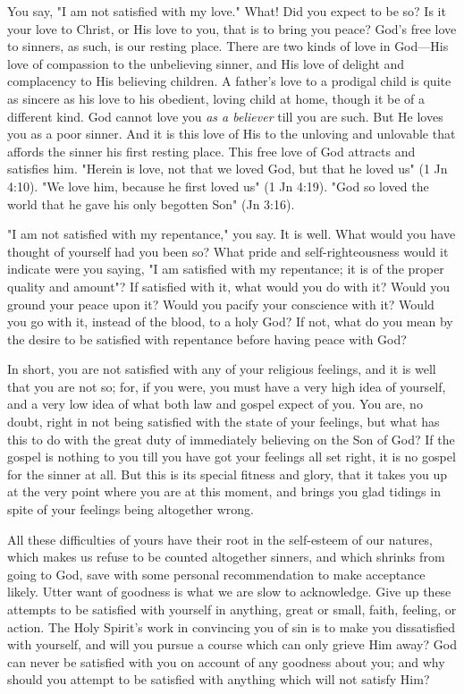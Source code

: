 \documentclass[
]{book}
\begin{document}
You say, "I am not satisfied with my love." What! Did you expect to be so? Is it your love to Christ, or His love to you, that is to bring you peace? God's free love to sinners, as such, is our resting place. There are two kinds of love in God---His love of compassion to the unbelieving sinner, and His love of delight and complacency to His believing children. A father's love to a prodigal child is quite as sincere as his love to his obedient, loving child at home, though it be of a different kind. God cannot love you \emph{as a believer} till you are such. But He loves you as a poor sinner. And it is this love of His to the unloving and unlovable that affords the sinner his first resting place. This free love of God attracts and satisfies him. "Herein is love, not that we loved God, but that he loved us" (1 Jn 4:10). "We love him, because he first loved us" (1 Jn 4:19). "God so loved the world that he gave his only begotten Son" (Jn 3:16).

"I am not satisfied with my repentance," you say. It is well. What would you have thought of yourself had you been so? What pride and self-righteousness would it indicate were you saying, "I am satisfied with my repentance; it is of the proper quality and amount"? If satisfied with it, what would you do with it? Would you ground your peace upon it? Would you pacify your conscience with it? Would you go with it, instead of the blood, to a holy God? If not, what do you mean by the desire to be satisfied with repentance before having peace with God?

In short, you are not satisfied with any of your religious feelings, and it is well that you are not so; for, if you were, you must have a very high idea of yourself, and a very low idea of what both law and gospel expect of you. You are, no doubt, right in not being satisfied with the state of your feelings, but what has this to do with the great duty of immediately believing on the Son of God? If the gospel is nothing to you till you have got your feelings all set right, it is no gospel for the sinner at all. But this is its special fitness and glory, that it takes you up at the very point where you are at this moment, and brings you glad tidings in spite of your feelings being altogether wrong.

All these difficulties of yours have their root in the self-esteem of our natures, which makes us refuse to be counted altogether sinners, and which shrinks from going to God, save with some personal recommendation to make acceptance likely. Utter want of goodness is what we are slow to acknowledge. Give up these attempts to be satisfied with yourself in anything, great or small, faith, feeling, or action. The Holy Spirit's work in convincing you of sin is to make you dissatisfied with yourself, and will you pursue a course which can only grieve Him away? God can never be satisfied with you on account of any goodness about you; and why should you attempt to be satisfied with anything which will not satisfy Him?
\end{document}
